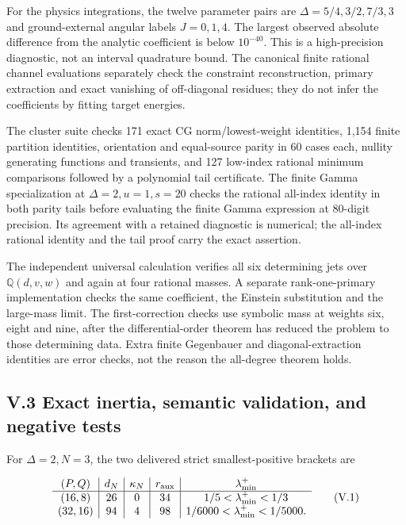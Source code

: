 For the physics integrations, the twelve parameter pairs are \(\Delta=5/4,3/2,7/3,3\) and ground-external angular labels \(J=0,1,4\). The largest observed absolute difference from the analytic coefficient is below \(10^{-40}\). This is a high-precision diagnostic, not an interval quadrature bound. The canonical finite rational channel evaluations separately check the constraint reconstruction, primary extraction and exact vanishing of off-diagonal residues; they do not infer the coefficients by fitting target energies.

The cluster suite checks 171 exact CG norm/lowest-weight identities, 1,154 finite partition identities, orientation and equal-source parity in 60 cases each, nullity generating functions and transients, and 127 low-index rational minimum comparisons followed by a polynomial tail certificate. The finite Gamma specialization at \(\Delta=2,u=1,s=20\) checks the rational all-index identity in both parity tails before evaluating the finite Gamma expression at 80-digit precision. Its agreement with a retained diagnostic is numerical; the all-index rational identity and the tail proof carry the exact assertion.

The independent universal calculation verifies all six determining jets over \(\mathbb Q(d,v,w)\) and again at four rational masses. A separate rank-one-primary implementation checks the same coefficient, the Einstein substitution and the large-mass limit. The first-correction checks use symbolic mass at weights six, eight and nine, after the differential-order theorem has reduced the problem to those determining data. Extra finite Gegenbauer and diagonal-extraction identities are error checks, not the reason the all-degree theorem holds.

\hypertarget{v.3-exact-inertia-semantic-validation-and-negative-tests}{%
\subsection{V.3 Exact inertia, semantic validation, and negative tests}\label{v.3-exact-inertia-semantic-validation-and-negative-tests}}

For \(\Delta=2,N=3\), the two delivered strict smallest-positive brackets are

\[
\begin{array}{c|c|c|c|c}
(P,Q)&d_N&\kappa_N& r_{\rm aux}&\lambda_{\min}^{+}\\
\hline
(16,8)&26&0&34&1/5<\lambda_{\min}^{+}<1/3\\
(32,16)&94&4&98&1/6000<\lambda_{\min}^{+}<1/5000 .
\end{array}
\tag{V.1}
\]

